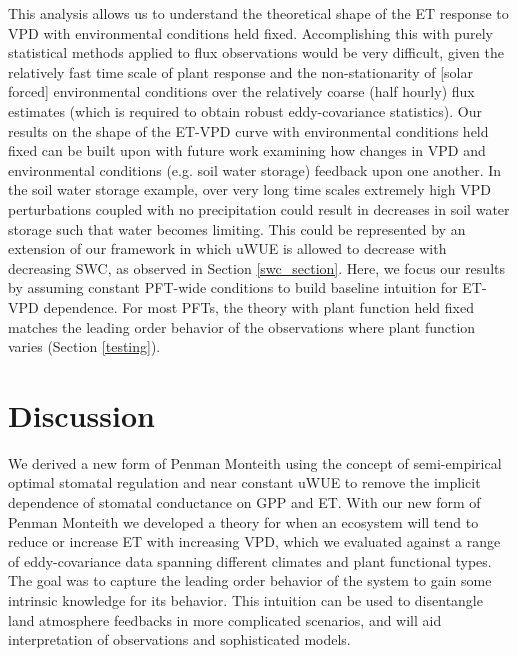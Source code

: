 \documentclass[draft,linenumbers]{agujournal}
\begin{document}
This analysis allows us to understand the theoretical shape of the ET
response to VPD with environmental conditions held
fixed. Accomplishing this with purely statistical
methods applied to flux observations would be very difficult, given
the relatively fast time scale of plant response and the
non-stationarity of [solar forced] environmental conditions over the
relatively coarse (half hourly) flux estimates (which is required to
obtain robust eddy-covariance statistics). Our results on the shape of
the ET-VPD curve with environmental conditions held
fixed can be built upon with future work examining how changes in VPD
and environmental conditions (e.g. soil water storage) feedback upon
one another. In the soil water storage example, over very long time
scales extremely high VPD perturbations coupled with no precipitation
could result in decreases in soil water storage such that water
becomes limiting. This could be represented by an extension of our
framework in which uWUE is allowed to decrease with decreasing SWC, as
observed in Section \ref{swc_section}. Here, we focus our results by
assuming constant PFT-wide conditions to build baseline intuition for
ET-VPD dependence. For most PFTs, the theory with plant function held
fixed matches the leading order behavior of the observations where
plant function varies (Section \ref{testing}).

\section{Discussion}

We derived a new form of Penman Monteith using the concept of
semi-empirical optimal stomatal regulation \citep{Lin_2015,
  MEDLYN_2011} and near constant uWUE \citep{Zhou_2015} to remove the
implicit dependence of stomatal conductance on GPP and ET. With our
new form of Penman Monteith we developed a theory for when an
ecosystem will tend to reduce or increase ET with increasing VPD,
which we evaluated against a range of eddy-covariance data spanning
different climates and plant functional types. The goal was to capture
the leading order behavior of the system to gain some intrinsic
knowledge for its behavior. This intuition can be used to disentangle
land atmosphere feedbacks in more complicated scenarios, and will aid
interpretation of observations and sophisticated models.
\end{document}

